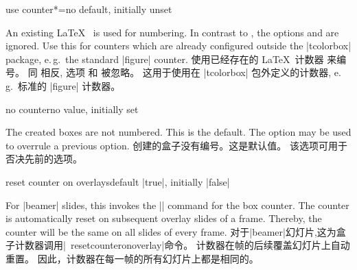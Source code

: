\begin{newTcbKey}[][doc new=2014-09-19]{use counter*}{=}{no default, initially unset}
\begin{stripedbox}
An existing \LaTeX\  is used for numbering. 
In contrast to , the options  and
 are ignored. 
Use this for counters which are already configured outside the |tcolorbox| package, e.\,g.\ the standard |figure| counter.
\tcblower
使用已经存在的 \LaTeX\ 计数器  来编号。%
同  相反, 选项  和  被忽略。%
这用于使用在 |tcolorbox| 包外定义的计数器, e.\,g.\ 标准的 |figure| 计数器。
\end{stripedbox}
\end{newTcbKey}

\begin{newTcbKey}{no counter}{}{no value, initially set}
\begin{stripedbox}
The created boxes are not numbered. This is the default. 
The option may be used to overrule a previous option.
\tcblower
创建的盒子没有编号。这是默认值。%
该选项可用于否决先前的选项。
\end{stripedbox}
\end{newTcbKey}


\begin{newTcbKey}[][doc new=2019-10-18]{reset counter on overlays}{}{default |true|, initially |false|}
\begin{stripedbox}
For |beamer| slides, this invokes the |\resetcounteronoverlays| command for the box counter. 
The counter is automatically reset on subsequent overlay slides of a frame.
Thereby, the counter will be the same on all slides of every frame.
\tcblower
对于|beamer|幻灯片,这为盒子计数器调用|\ resetcounteronoverlay|命令。
计数器在帧的后续覆盖幻灯片上自动重置。
因此，计数器在每一帧的所有幻灯片上都是相同的。
\end{stripedbox}
\end{newTcbKey}

